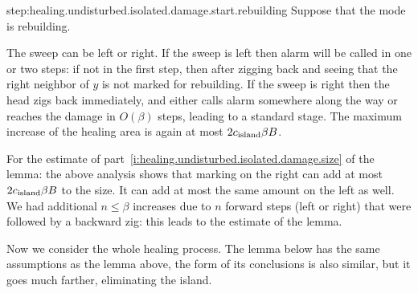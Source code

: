 \documentclass[12pt]{memoir}
\renewcommand{\le}{\leq}
\def\B{B}
\newcommand{\cns}[1]{c_{\textrm{\upshape #1}}}
\begin{document}
\begin{Proof}
\begin{pproof}
\begin{step+}{step:healing.undisturbed.isolated.damage.start.rebuilding}
Suppose that the mode is rebuilding.
\end{step+}
\begin{prooofi}
The sweep can be left or right.
If the sweep is left then alarm will be called in one or two steps:
if not in the first step, then after zigging back and seeing that the right neighbor of
 \( y \) is not marked for rebuilding.
If the sweep is right then the head zigs back immediately, 
and either calls alarm somewhere along the way or
reaches the damage in \( O(\beta) \) steps, leading to a standard stage.
The maximum increase of the healing area is again at most \( 2\cns{island}\beta\B \).
\end{prooofi} %
\end{pproof} %
For the estimate of part~\eqref{i:healing.undisturbed.isolated.damage.size}
of the lemma: the above analysis shows that marking on the right can add 
at most \( 2\cns{island}\beta\B \) to the size.
It can add at most the same amount on the left as well.
We had additional \( n\le\beta \) increases due to \( n \) forward steps (left or right)
that were followed by a backward zig: this leads to the estimate of the lemma.
\end{Proof}

Now we consider the whole healing process.
The lemma below has the same assumptions as the lemma above,
the form of its conclusions is also similar, but it goes much farther,
eliminating the island.
\end{document}
